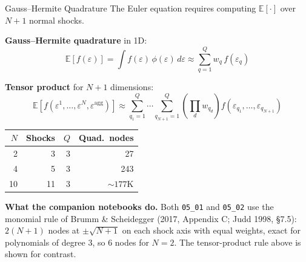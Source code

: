 \documentclass[aspectratio=169,11pt]{beamer}
\newcommand{\E}[1]{\mathbb{E}\!\left[#1\right]}
\begin{document}
\begin{frame}{Gauss--Hermite Quadrature}
\footnotesize
The Euler equation requires computing $\E{\cdot}$ over $N+1$ normal shocks.

\textbf{Gauss--Hermite quadrature} in 1D:
\[
\E{f(\varepsilon)} = \int f(\varepsilon)\, \phi(\varepsilon)\,d\varepsilon \approx \sum_{q=1}^{Q} w_q \, f(\varepsilon_q)
\]

\textbf{Tensor product} for $N+1$ dimensions:
\[
\E{f(\varepsilon^1, \ldots, \varepsilon^N, \varepsilon^{\text{agg}})} \approx \sum_{q_1=1}^{Q}\cdots\sum_{q_{N+1}=1}^{Q} \left(\prod_{d} w_{q_d}\right) f(\varepsilon_{q_1}, \ldots, \varepsilon_{q_{N+1}})
\]

\begin{center}
\begin{tabular}{rrrr}
\toprule
$N$ & \textbf{Shocks} & $Q$ & \textbf{Quad.\ nodes} \\
\midrule
2 & 3 & 3 & 27 \\
4 & 5 & 3 & 243 \\
10 & 11 & 3 & $\sim 177$K \\
\bottomrule
\end{tabular}
\end{center}

{\scriptsize \textbf{What the companion notebooks do.} Both \texttt{05\_01} and \texttt{05\_02} use the monomial rule of Brumm \& Scheidegger (2017, Appendix C; Judd 1998, \S 7.5): $2(N+1)$ nodes at $\pm\sqrt{N+1}$ on each shock axis with equal weights, exact for polynomials of degree 3, so $6$ nodes for $N = 2$. The tensor-product rule above is shown for contrast.}
\end{frame}
\end{document}
